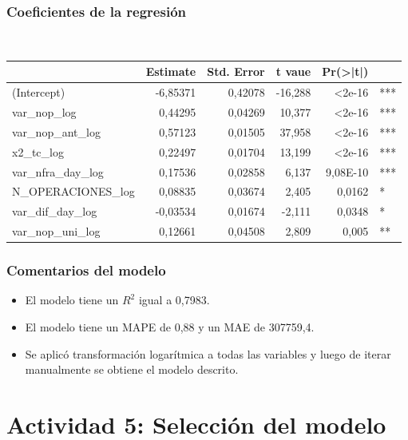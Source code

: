 \documentclass[
	11pt, %
	spanish, %
]{fphw}
\begin{document}
\subsubsection*{Coeficientes de la regresión} \hfill \\
\begin{table}[h!]
\centering
\label{coef_mod4}
\begin{tabular}{lrrrrl}
\hline
 & \multicolumn{1}{c}{Estimate} & \multicolumn{1}{c}{Std. Error} & \multicolumn{1}{c}{t vaue} & \multicolumn{1}{c}{Pr(\textgreater{}|t|)} & \multicolumn{1}{c}{} \\ \hline
(Intercept) & -6,85371 & 0,42078 & -16,288 & \textless 2e-16 & *** \\
var\_nop\_log & 0,44295 & 0,04269 & 10,377 & \textless 2e-16 & *** \\
var\_nop\_ant\_log & 0,57123 & 0,01505 & 37,958 & \textless 2e-16 & *** \\
x2\_tc\_log & 0,22497 & 0,01704 & 13,199 & \textless 2e-16 & *** \\
var\_nfra\_day\_log & 0,17536 & 0,02858 & 6,137 & 9,08E-10 & *** \\
N\_OPERACIONES\_log & 0,08835 & 0,03674 & 2,405 & 0,0162 & * \\
var\_dif\_day\_log & -0,03534 & 0,01674 & -2,111 & 0,0348 & * \\
var\_nop\_uni\_log & 0,12661 & 0,04508 & 2,809 & 0,005 & **
\end{tabular}
\end{table}

\subsubsection*{Comentarios del modelo}
\begin{itemize}
\item El modelo tiene un $R^{2}$ igual a 0,7983.
\item El modelo tiene un MAPE de 0,88 y un MAE de 307759,4.
\item Se aplicó transformación logarítmica a todas las variables y luego de iterar manualmente se obtiene el modelo descrito. 
\end{itemize}

\newpage
\section*{Actividad 5: Selección del modelo}
\end{document}

